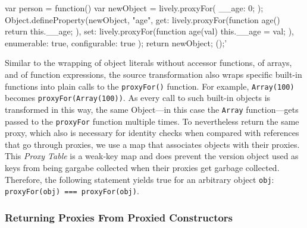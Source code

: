 \begin{code}{}{}
var person = function() {
    var newObject = lively.proxyFor({
        __age: 0;
    });
    Object.defineProperty(newObject, "age", {
        get: lively.proxyFor(function age() {
            return this.__age;
        }),
        set: lively.proxyFor(function age(val) {
            this.__age = val;
        }),
        enumerable: true,
        configurable: true
    });
    return newObject;
}();'
\end{code}
\iffalse
\end{verbatim}\fi

Similar to the wrapping of object literals without accessor functions, of arrays, and of function expressions, the source transformation also wraps specific built-in functions into plain calls to the \lstinline{proxyFor()} function.
For example, \lstinline{Array(100)} becomes \lstinline{proxyFor(Array(100))}.
As every call to such built-in objects is transformed in this way, the same Object---in this case the \lstinline{Array} function---gets passed to the \lstinline{proxyFor} function multiple times.
To nevertheless return the same proxy, which also is necessary for identity checks when compared with references that go through proxies, we use a map that associates objects with their proxies.
This \emph{Proxy Table} is a weak-key map and does prevent the version object used as keys from being gargabe collected when their proxies get garbage collected.
Therefore, the following statement yields true for an arbitrary object \lstinline{obj}: \lstinline{proxyFor(obj) === proxyFor(obj)}.



\subsubsection{Returning Proxies From Proxied Constructors}

